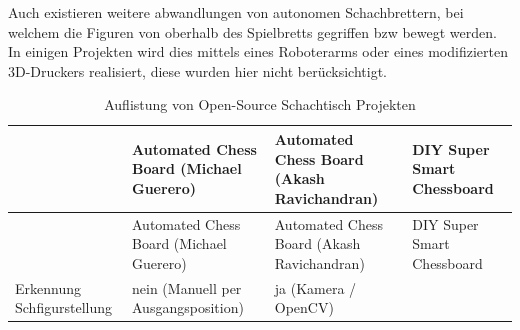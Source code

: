 Auch existieren weitere abwandlungen von autonomen Schachbrettern, bei
welchem die Figuren von oberhalb des Spielbretts gegriffen bzw bewegt
werden. In einigen Projekten wird dies mittels eines Roboterarms
\cite{actprojectrobot} oder eines modifizierten 3D-Druckers
realisiert, diese wurden hier nicht berücksichtigt.

\begin{longtable}[]{@{}llll@{}}
\caption{Auflistung von Open-Source Schachtisch
Projekten}\tabularnewline
\toprule
\begin{minipage}[b]{0.24\columnwidth}\raggedright
\strut
\end{minipage} & \begin{minipage}[b]{0.24\columnwidth}\raggedright
Automated Chess Board (Michael Guerero)\strut
\end{minipage} & \begin{minipage}[b]{0.25\columnwidth}\raggedright
Automated Chess Board (Akash Ravichandran)\strut
\end{minipage} & \begin{minipage}[b]{0.16\columnwidth}\raggedright
DIY Super Smart Chessboard\strut
\end{minipage}\tabularnewline
\midrule
\endfirsthead
\toprule
\begin{minipage}[b]{0.24\columnwidth}\raggedright
\strut
\end{minipage} & \begin{minipage}[b]{0.24\columnwidth}\raggedright
Automated Chess Board (Michael Guerero)\strut
\end{minipage} & \begin{minipage}[b]{0.25\columnwidth}\raggedright
Automated Chess Board (Akash Ravichandran)\strut
\end{minipage} & \begin{minipage}[b]{0.16\columnwidth}\raggedright
DIY Super Smart Chessboard\strut
\end{minipage}\tabularnewline
\midrule
\endhead
\begin{minipage}[t]{0.24\columnwidth}\raggedright
Erkennung Schfigurstellung\strut
\end{minipage} & \begin{minipage}[t]{0.24\columnwidth}\raggedright
nein (Manuell per Ausgangsposition)\strut
\end{minipage} & \begin{minipage}[t]{0.25\columnwidth}\raggedright
ja (Kamera / OpenCV)\strut
\end{minipage} & \begin{minipage}[t]{0.16\columnwidth}\raggedright

\end{minipage}
\end{longtable}
